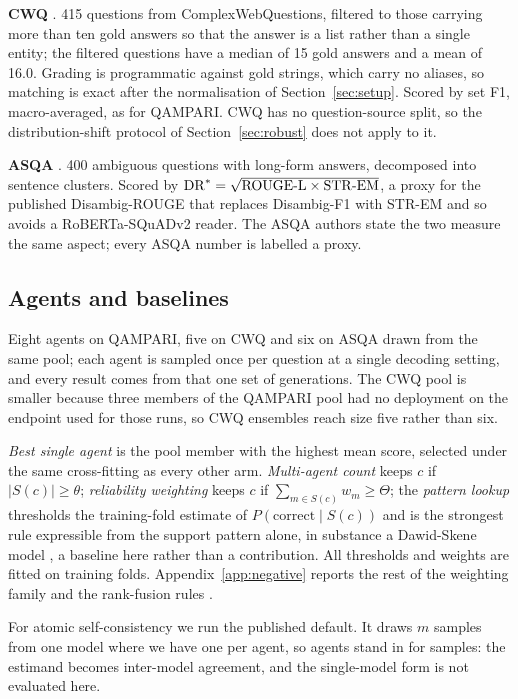 \documentclass{article}
\begin{document}
\textbf{CWQ} \cite{talmor2018web}. 415 questions from ComplexWebQuestions, filtered to those carrying more than ten gold answers so that the answer is a list rather than a single entity; the filtered questions have a median of 15 gold answers and a mean of 16.0. Grading is programmatic against gold strings, which carry no aliases, so matching is exact after the normalisation of Section~\ref{sec:setup}. Scored by set F1, macro-averaged, as for QAMPARI. CWQ has no question-source split, so the distribution-shift protocol of Section~\ref{sec:robust} does not apply to it.

\textbf{ASQA} \cite{stelmakh2022asqa}. 400 ambiguous questions with long-form answers, decomposed into sentence clusters. Scored by $\mathrm{DR}^* = \sqrt{\mathrm{ROUGE\text-L} \times \mathrm{STR\text-EM}}$, a proxy for the published Disambig-ROUGE that replaces Disambig-F1 with STR-EM and so avoids a RoBERTa-SQuADv2 reader. The ASQA authors state the two measure the same aspect; every ASQA number is labelled a proxy.

\subsection{Agents and baselines}

Eight agents on QAMPARI, five on CWQ and six on ASQA drawn from the same pool; each agent is sampled once per question at a single decoding setting, and every result comes from that one set of generations. The CWQ pool is smaller because three members of the QAMPARI pool had no deployment on the endpoint used for those runs, so CWQ ensembles reach size five rather than six.

\emph{Best single agent} is the pool member with the highest mean score, selected under the same cross-fitting as every other arm. \emph{Multi-agent count} keeps $c$ if $|S(c)| \geq \theta$; \emph{reliability weighting} keeps $c$ if $\sum_{m \in S(c)} w_m \geq \Theta$; the \emph{pattern lookup} thresholds the training-fold estimate of $P(\mathrm{correct} \mid S(c))$ and is the strongest rule expressible from the support pattern alone, in substance a Dawid-Skene model \cite{dawid1979maximum}, a baseline here rather than a contribution. All thresholds and weights are fitted on training folds. Appendix~\ref{app:negative} reports the rest of the weighting family and the rank-fusion rules \cite{cormack2009reciprocal}.

For atomic self-consistency \cite{thirukovalluru2024atomic} we run the published default. It draws $m$ samples from one model where we have one per agent, so agents stand in for samples: the estimand becomes inter-model agreement, and the single-model form is not evaluated here.
\end{document}
